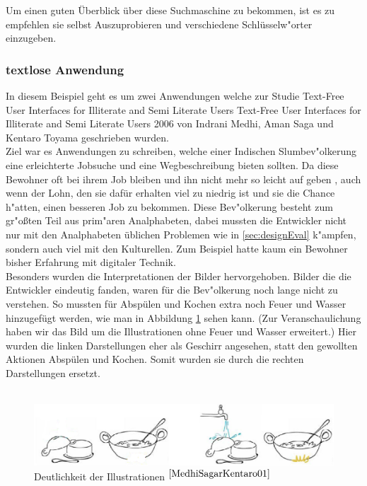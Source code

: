 Um einen guten Überblick über diese Suchmaschine zu bekommen, ist es zu empfehlen sie selbst Auszuprobieren und verschiedene Schlüsselw"orter einzugeben.

\newpage
\subsubsection{textlose Anwendung}\label{sec:beisp3}
In diesem Beispiel geht es um zwei Anwendungen welche zur Studie \glqq Text-Free User Interfaces for Illiterate and Semi Literate Users \grqq
{}
					{Text-Free User Interfaces for Illiterate and Semi Literate Users}
					{2006}
					{}
 von Indrani Medhi, Aman Saga und Kentaro Toyama geschrieben wurden.\\
Ziel war es Anwendungen zu schreiben, welche einer Indischen Slumbev"olkerung eine erleichterte Jobsuche und eine Wegbeschreibung bieten sollten. Da diese Bewohner oft bei ihrem Job bleiben und ihn nicht mehr so leicht auf geben , auch wenn der Lohn, den sie dafür erhalten viel zu niedrig ist und sie die Chance h"atten, einen besseren Job zu bekommen. Diese Bev"olkerung besteht zum gr"oßten Teil aus prim"aren Analphabeten, dabei mussten die Entwickler nicht nur mit den Analphabeten üblichen Problemen wie in \ref{sec:designEval} k"ampfen, sondern auch viel mit den Kulturellen. Zum Beispiel hatte kaum ein Bewohner bisher Erfahrung mit digitaler Technik.\\
Besonders wurden die Interpretationen der Bilder hervorgehoben. Bilder die die Entwickler eindeutig fanden, waren für die Bev"olkerung noch lange nicht zu verstehen. So mussten für Abspülen und Kochen extra noch Feuer und Wasser hinzugefügt werden, wie man in Abbildung \ref{fig:picfail} sehen kann. (Zur Veranschaulichung haben wir das Bild um die Illustrationen ohne Feuer und Wasser erweitert.) Hier wurden die linken Darstellungen eher als Geschirr angesehen, statt den gewollten Aktionen Abspülen und Kochen. Somit wurden sie durch die rechten Darstellungen ersetzt.\\\\

\begin{figure}[h]
	\centering
		\includegraphics[width=1.00\textwidth]{Daten/pic_fail2.PNG}
	\caption{Deutlichkeit der Illustrationen $^{\ref{MedhiSagarKentaro01}}$}
	\label{fig:picfail}
\end{figure}

